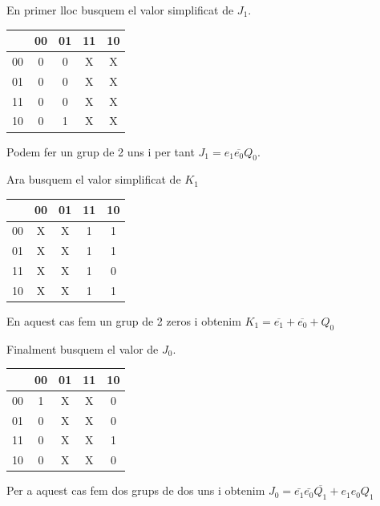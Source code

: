 \documentclass[12pt, a4papre]{article}
\begin{document}
	En primer lloc busquem el valor simplificat de $J_1$.
	
	\begin{table}[!h]
		\centering
		\begin{tabular}{| c | c | c | c | c |}
			\hline
				&00	&01	&11	&10	\\
			\hline
			00	&0	&0	&X	&X	\\
			\hline
			01	&0	&0	&X	&X	\\
			\hline
			11	&0	&0	&X	&X	\\
			\hline
			10	&0	&1	&X	&X	\\
			\hline
		\end{tabular}
	\end{table}
	
	Podem fer un grup de 2 uns i per tant $J_1 = e_1\overline{e_0}Q_0$.
	
	Ara busquem el valor simplificat de $K_1$
	
	\begin{table}[!h]
		\centering
		\begin{tabular}{| c | c | c | c | c |}
			\hline
				&00	&01	&11	&10	\\
			\hline
			00	&X	&X	&1	&1	\\
			\hline
			01	&X	&X	&1	&1	\\
			\hline
			11	&X	&X	&1	&0	\\
			\hline
			10	&X	&X	&1	&1	\\
			\hline
		\end{tabular}
	\end{table}
	
	En aquest cas fem un grup de 2 zeros i obtenim $K_1 = \overline{e_1} + \overline{e_0} + Q_0$
	
	Finalment busquem el valor de $J_0$.
	
	\begin{table}[!h]
		\centering
		\begin{tabular}{| c | c | c | c | c |}
			\hline
				&00	&01	&11	&10	\\
			\hline
			00	&1	&X	&X	&0	\\
			\hline
			01	&0	&X	&X	&0	\\
			\hline
			11	&0	&X	&X	&1	\\
			\hline
			10	&0	&X	&X	&0	\\
			\hline
		\end{tabular}
	\end{table}
	
	Per a aquest cas fem dos grups de dos uns i obtenim $J_0 =  \bar{e_1}\bar{e_0}\overline{Q_1} + e_1e_0Q_1$
	
\end{document}
